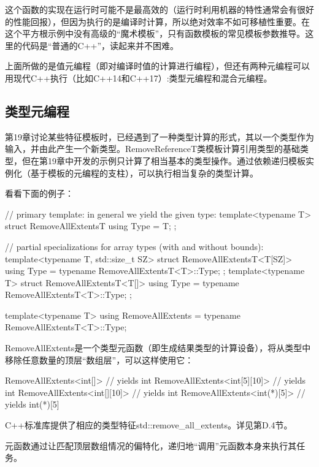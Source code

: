 这个函数的实现在运行时可能不是最高效的（运行时利用机器的特性通常会有很好的性能回报），但因为执行的是编译时计算，所以绝对效率不如可移植性重要。在这个平方根示例中没有高级的“魔术模板”，只有函数模板的常见模板参数推导。这里的代码是“普通的C++”，读起来并不困难。

上面所做的是值元编程（即对编译时值的计算进行编程），但还有两种元编程可以用现代C++执行（比如C++14和C++17）:类型元编程和混合元编程。

\subsection{类型元编程}

第19章讨论某些特征模板时，已经遇到了一种类型计算的形式，其以一个类型作为输入，并由此产生一个新类型。RemoveReferenceT类模板计算引用类型的基础类型，但在第19章中开发的示例只计算了相当基本的类型操作。通过依赖递归模板实例化（基于模板的元编程的支柱），可以执行相当复杂的类型计算。

看看下面的例子：

\begin{cpp}
// primary template: in general we yield the given type:
template<typename T>
struct RemoveAllExtentsT {
	using Type = T;
};

// partial specializations for array types (with and without bounds):
template<typename T, std::size_t SZ>
struct RemoveAllExtentsT<T[SZ]> {
	using Type = typename RemoveAllExtentsT<T>::Type;
};
template<typename T>
struct RemoveAllExtentsT<T[]> {
	using Type = typename RemoveAllExtentsT<T>::Type;
};

template<typename T>
using RemoveAllExtents = typename RemoveAllExtentsT<T>::Type;
\end{cpp}

RemoveAllExtents是一个类型元函数（即生成结果类型的计算设备），将从类型中移除任意数量的顶层“数组层”，可以这样使用它：

\begin{cpp}
RemoveAllExtents<int[]> // yields int
RemoveAllExtents<int[5][10]> // yields int
RemoveAllExtents<int[][10]> // yields int
RemoveAllExtents<int(*)[5]> // yields int(*)[5]
\end{cpp}

\begin{notice}
C++标准库提供了相应的类型特征std::remove\_all\_extents。详见第D.4节。
\end{notice}

元函数通过让匹配顶层数组情况的偏特化，递归地“调用”元函数本身来执行其任务。


